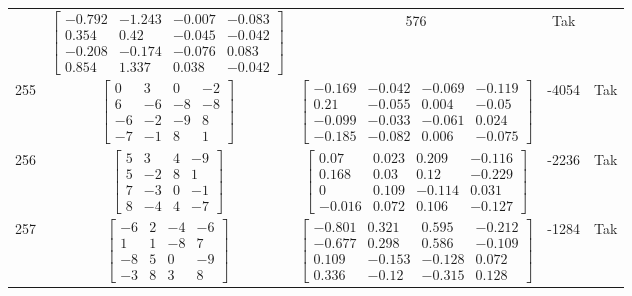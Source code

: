 \documentclass[a4paper,12pt]{article}
\begin{document}
\begin{tabular}{c c c c c}
&
$\begin{bmatrix} -0.792 & -1.243 & -0.007 & -0.083 \\ 0.354 & 0.42 & -0.045 & -0.042 \\ -0.208 & -0.174 & -0.076 & 0.083 \\ 0.854 & 1.337 & 0.038 & -0.042 \end{bmatrix}$
&
576
&
Tak
\\
255
&
$\begin{bmatrix} 0 & 3 & 0 & -2 \\ 6 & -6 & -8 & -8 \\ -6 & -2 & -9 & 8 \\ -7 & -1 & 8 & 1 \end{bmatrix}$
&
$\begin{bmatrix} -0.169 & -0.042 & -0.069 & -0.119 \\ 0.21 & -0.055 & 0.004 & -0.05 \\ -0.099 & -0.033 & -0.061 & 0.024 \\ -0.185 & -0.082 & 0.006 & -0.075 \end{bmatrix}$
&
-4054
&
Tak
\\
256
&
$\begin{bmatrix} 5 & 3 & 4 & -9 \\ 5 & -2 & 8 & 1 \\ 7 & -3 & 0 & -1 \\ 8 & -4 & 4 & -7 \end{bmatrix}$
&
$\begin{bmatrix} 0.07 & 0.023 & 0.209 & -0.116 \\ 0.168 & 0.03 & 0.12 & -0.229 \\ 0 & 0.109 & -0.114 & 0.031 \\ -0.016 & 0.072 & 0.106 & -0.127 \end{bmatrix}$
&
-2236
&
Tak
\\
257
&
$\begin{bmatrix} -6 & 2 & -4 & -6 \\ 1 & 1 & -8 & 7 \\ -8 & 5 & 0 & -9 \\ -3 & 8 & 3 & 8 \end{bmatrix}$
&
$\begin{bmatrix} -0.801 & 0.321 & 0.595 & -0.212 \\ -0.677 & 0.298 & 0.586 & -0.109 \\ 0.109 & -0.153 & -0.128 & 0.072 \\ 0.336 & -0.12 & -0.315 & 0.128 \end{bmatrix}$
&
-1284
&
Tak
\\

\end{tabular}
\end{document}
